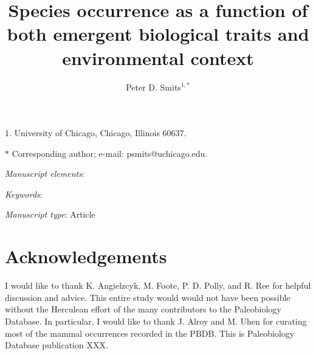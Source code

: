 \documentclass[11pt]{article}
\title{Species occurrence as a function of both emergent biological traits and environmental context}
\author{Peter D. Smits$^{1, \ast}$\\}
\date{}
\begin{document}
\maketitle

\noindent{}1. University of Chicago, Chicago, Illinois 60637.

\noindent{}$\ast$ Corresponding author; e-mail: psmits@uchicago.edu.

\bigskip

\textit{Manuscript elements}:

\bigskip

\textit{Keywords}:

\bigskip

\textit{Manuscript type}: Article

\bigskip


\linenumbers
\modulolinenumbers[2]

\newpage{}

%










\section*{Acknowledgements}
I would like to thank K. Angielzcyk, M. Foote, P. D. Polly, and R. Ree for helpful discussion and advice. This entire study would would not have been possible without the Herculean effort of the many contributors to the Paleobiology Database. In particular, I would like to thank J. Alroy and M. Uhen for curating most of the mammal occurrences recorded in the PBDB. This is Paleobiology Database publication XXX.




\end{document}
